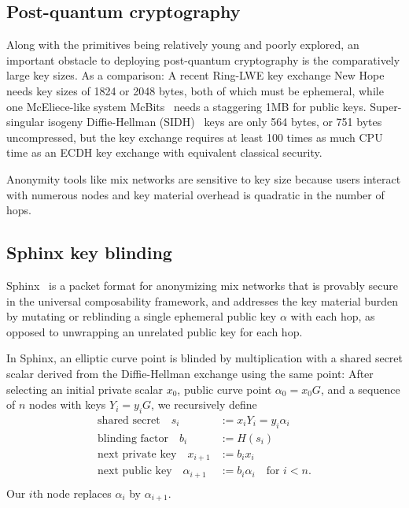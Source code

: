 \documentclass[twoside,letterpaper]{llncs}
\def\mathcomma{}
\begin{document}
\subsection{Post-quantum cryptography}

Along with the primitives being relatively young and poorly explored,
an important obstacle to deploying post-quantum cryptography is
the comparatively large key sizes.  As a comparison: 
%
A recent Ring-LWE key exchange New Hope~\cite[\S7, p.10]{NewHope} needs
 key sizes of 1824 or 2048 bytes, both of which must be ephemeral,
while one McEliece-like system McBits~\cite{McBits,InitRec}
 needs a staggering 1MB for public keys.
%
Super-singular isogeny Diffie-Hellman (SIDH)~\cite[p. 21]{SIDH-2016} keys
are only 564 bytes, or 751 bytes uncompressed, but
 the key exchange requires at least 100 times as much CPU time as
 an ECDH key exchange with equivalent classical security.

Anonymity tools like mix networks are sensitive to key size because 
users interact with numerous nodes and key material overhead is 
quadratic in the number of hops. %


\subsection{Sphinx key blinding}


Sphinx~\cite{Sphinx} is a packet format for anonymizing mix networks
that is provably secure in the universal composability framework, and
 addresses the key material burden by mutating or reblinding a
 single ephemeral public key $\alpha$ with each hop,
 as opposed to unwrapping an unrelated public key for each hop.

In Sphinx, an elliptic curve point is blinded by multiplication with
a shared secret scalar derived from the Diffie-Hellman exchange using
the same point:
After selecting an initial private scalar $x_0$,
 public curve point $\alpha_0 = x_0 G$, and 
 a sequence of $n$ nodes with keys $Y_i = y_i G$,
we recursively define 
\[ \begin{aligned}
\textrm{shared secret}\quad
 s_i &:= x_i Y_i = y_i \alpha_i \mathcomma \\
\textrm{blinding factor}\quad
 b_i &:= H(s_i) \mathcomma \\
\textrm{next private key}\quad
 x_{i+1} &:= b_i x_i \mathcomma \\ %
\textrm{next public key}\quad
 \alpha_{i+1} &:= b_i \alpha_i \quad\textrm{for $i < n$.} \\
\end{aligned} \]
Our $i$th node replaces $\alpha_i$ by $\alpha_{i+1}$.
\end{document}
